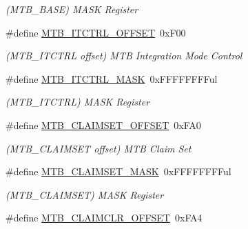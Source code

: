 \begin{DoxyCompactItemize}
\begin{DoxyCompactList}\small\item\em (M\+T\+B\+\_\+\+B\+A\+S\+E) M\+A\+S\+K Register \end{DoxyCompactList}\item 
\hypertarget{group___s_a_m_l21___m_t_b_ga219a5fa201bee0a15aa0bf923873d8a2}{}\#define \hyperlink{group___s_a_m_l21___m_t_b_ga219a5fa201bee0a15aa0bf923873d8a2}{M\+T\+B\+\_\+\+I\+T\+C\+T\+R\+L\+\_\+\+O\+F\+F\+S\+E\+T}~0x\+F00\label{group___s_a_m_l21___m_t_b_ga219a5fa201bee0a15aa0bf923873d8a2}

\begin{DoxyCompactList}\small\item\em (M\+T\+B\+\_\+\+I\+T\+C\+T\+R\+L offset) M\+T\+B Integration Mode Control \end{DoxyCompactList}\item 
\hypertarget{group___s_a_m_l21___m_t_b_ga17b76a70b93cab6a850ebe5b5e3ea062}{}\#define \hyperlink{group___s_a_m_l21___m_t_b_ga17b76a70b93cab6a850ebe5b5e3ea062}{M\+T\+B\+\_\+\+I\+T\+C\+T\+R\+L\+\_\+\+M\+A\+S\+K}~0x\+F\+F\+F\+F\+F\+F\+F\+Ful\label{group___s_a_m_l21___m_t_b_ga17b76a70b93cab6a850ebe5b5e3ea062}

\begin{DoxyCompactList}\small\item\em (M\+T\+B\+\_\+\+I\+T\+C\+T\+R\+L) M\+A\+S\+K Register \end{DoxyCompactList}\item 
\hypertarget{group___s_a_m_l21___m_t_b_ga7e79518eba97b6b37cb1c8adc23172c9}{}\#define \hyperlink{group___s_a_m_l21___m_t_b_ga7e79518eba97b6b37cb1c8adc23172c9}{M\+T\+B\+\_\+\+C\+L\+A\+I\+M\+S\+E\+T\+\_\+\+O\+F\+F\+S\+E\+T}~0x\+F\+A0\label{group___s_a_m_l21___m_t_b_ga7e79518eba97b6b37cb1c8adc23172c9}

\begin{DoxyCompactList}\small\item\em (M\+T\+B\+\_\+\+C\+L\+A\+I\+M\+S\+E\+T offset) M\+T\+B Claim Set \end{DoxyCompactList}\item 
\hypertarget{group___s_a_m_l21___m_t_b_ga180ef9f48857f0d749d022ee00c8bf28}{}\#define \hyperlink{group___s_a_m_l21___m_t_b_ga180ef9f48857f0d749d022ee00c8bf28}{M\+T\+B\+\_\+\+C\+L\+A\+I\+M\+S\+E\+T\+\_\+\+M\+A\+S\+K}~0x\+F\+F\+F\+F\+F\+F\+F\+Ful\label{group___s_a_m_l21___m_t_b_ga180ef9f48857f0d749d022ee00c8bf28}

\begin{DoxyCompactList}\small\item\em (M\+T\+B\+\_\+\+C\+L\+A\+I\+M\+S\+E\+T) M\+A\+S\+K Register \end{DoxyCompactList}\item 
\hypertarget{group___s_a_m_l21___m_t_b_ga769dd66441d3225bad19869a8af32ca5}{}\#define \hyperlink{group___s_a_m_l21___m_t_b_ga769dd66441d3225bad19869a8af32ca5}{M\+T\+B\+\_\+\+C\+L\+A\+I\+M\+C\+L\+R\+\_\+\+O\+F\+F\+S\+E\+T}~0x\+F\+A4\label{group___s_a_m_l21___m_t_b_ga769dd66441d3225bad19869a8af32ca5}


\end{DoxyCompactItemize}
